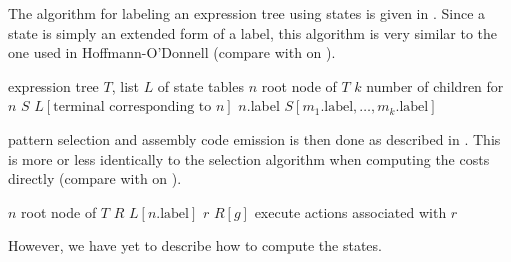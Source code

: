 The algorithm for labeling an \gls{expression tree} using \glspl{state} is given
in .
%
Since a \gls{state} is simply an extended form of a label, this algorithm is
very similar to the one used in Hoffmann-O'Donnell (compare with
 on
).
%
\begin{algorithm}[t]
               {expression tree $T$, list $L$ of state tables}%
  {%
    $n$ \Assign root node of $T$\;
    $k$ \Assign number of children for $n$\;
    $S$ \Assign $L[\text{terminal corresponding to $n$}]$\;
    $n$.label \Assign $S[m_1.\text{label}, \ldots, m_k.\text{label}]$\;
  }

  \caption[%
            Algorithm for labeling an expression tree using states%
          ]{%
            Labels an expression tree using states%
          }
\end{algorithm}
%
\Gls{pattern selection} and \gls{assembly code} emission is then done as
described in .
%
This is more or less identically to the selection algorithm when computing the
costs directly (compare with  on
).
%
\begin{algorithm}[t]
  {%
    $n$ \Assign root node of $T$\;
    $R$ \Assign $L[n\text{.label}]$\;
    $r$ \Assign $R[g]$\;
    execute actions associated with $r$\;
  }

  \caption[%
            Algorithm for selecting the rules for a labeled expression tree%
          ]%
          {%
            Selects optimal sequence of rules that reduces a given labeled
            expression tree to a given nonterminal%
          }
\end{algorithm}
%
However, we have yet to describe how to compute the \glspl{state}.


